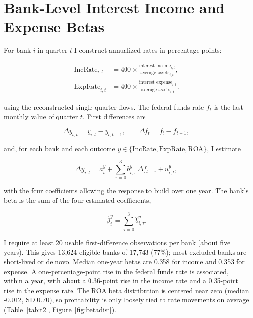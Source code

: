 \documentclass[11pt]{article}
\begin{document}
\section{Bank-Level Interest Income and Expense Betas}

For bank $i$ in quarter $t$ I construct annualized rates in percentage
points:

\begin{equation}
\begin{aligned}
\text{IncRate}_{i,t}&=400\times\frac{\text{interest income}_{i,t}}{\text{average assets}_{i,t}},\\
\text{ExpRate}_{i,t}&=400\times\frac{\text{interest expense}_{i,t}}{\text{average assets}_{i,t}}.
\end{aligned}
\end{equation}

using the reconstructed single-quarter flows. The federal funds rate
$f_t$ is the last monthly value of quarter $t$. First differences are

\begin{equation}
\Delta y_{i,t}=y_{i,t}-y_{i,t-1},\qquad \Delta f_t=f_t-f_{t-1},
\end{equation}

and, for each bank and each outcome $y\in\{\text{IncRate},\text{ExpRate},
\text{ROA}\}$, I estimate

\begin{equation}
\Delta y_{i,t}=a_i^y+\sum_{\tau=0}^{3}b_{i,\tau}^{y}\,\Delta f_{t-\tau}+u_{i,t}^y,
\end{equation}

with the four coefficients allowing the response to build over one year.
The bank's beta is the sum of the four estimated coefficients,

\begin{equation}
\widehat{\beta}_i^y=\sum_{\tau=0}^{3}\widehat{b}_{i,\tau}^{y}.
\end{equation}

I require at least 20 usable first-difference observations per bank
(about five years). This gives 13,624 eligible banks of 17,743 (77\%); most
excluded banks are short-lived or de novo. Median one-year betas are 0.358 for
income and 0.353 for expense. A one-percentage-point rise in the federal funds
rate is associated, within a year, with about a 0.36-point rise in the income
rate and a 0.35-point rise in the expense rate. The ROA beta distribution is
centered near zero (median -0.012, SD 0.70), so profitability is only loosely
tied to rate movements on average (Table~\ref{tab:t2}, Figure~\ref{fig:betadist}).
\end{document}

